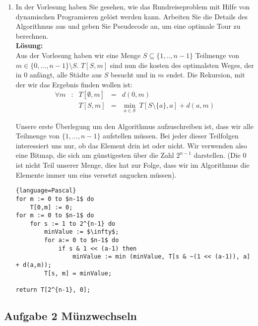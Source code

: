 \documentclass[11pt,a4paper,ngerman]{article}
\begin{document}
\begin{enumerate}[\bfseries (a)]
\item In der Vorlesung haben Sie gesehen, wie das Rundreiseproblem mit Hilfe von dynamischen Programieren gelöst werden kann. Arbeiten Sie die Details des Algorithmus aus und geben Sie Pseudecode an, um eine optimale Tour zu berechnen.\\

\textbf{Lösung:}\\

Aus der Vorlesung haben wir eine Menge $S \subseteq \{1,..,n-1 \}$ Teilmenge von $m \in \{ 0, ... , n-1\} \setminus S$. $T[S , m]$ sind nun die kosten des optimalsten Weges, der in 0 anfängt, alle Städte aus $S$ besucht und in $m$ endet. Die Rekursion, mit der wir das Ergebnis finden wollen ist:
$$
\begin{array}{lcrcl}
\forall m &:& T[\emptyset , m] &=& d(0,m)\\
&& T[ S,m ] &=& \underset{a\in S}{\min} \; T[S \setminus \{ a \} , a] + d(a,m)
\end{array}
$$

Unsere erste Überlegung um den Algorithmus aufzuschreiben ist, dass wir alle Teilmenge von $\{ 1, ... , n-1 \}$ aufstellen müssen. Bei jeder dieser Teilfolgen interessiert uns nur, ob das Element drin ist oder nicht. Wir verwenden also eine Bitmap, die sich am günstigesten über die Zahl $2^{n-1}$ darstellen. (Die 0 ist nicht Teil unserer Menge, dies hat zur Folge, dass wir im Algorithmus die Elemente immer um eins versetzt angucken müssen).

\begin{lstlisting}{language=Pascal}
for m := 0 to $n-1$ do
	T[0,m] := 0;
for m := 0 to $n-1$ do
	for s := 1 to 2^{n-1} do
		minValue := $\infty$;
		for a:= 0 to $n-1$ do
			if s & 1 << (a-1) then
				minValue := min (minValue, T[s & ~(1 << (a-1)), a] + d(a,m));
		T[s, m] = minValue;

return T[2^{n-1}, 0];
\end{lstlisting}

\end{enumerate}



\subsection*{Aufgabe 2 \mdseries Münzwechseln}
\end{document}
